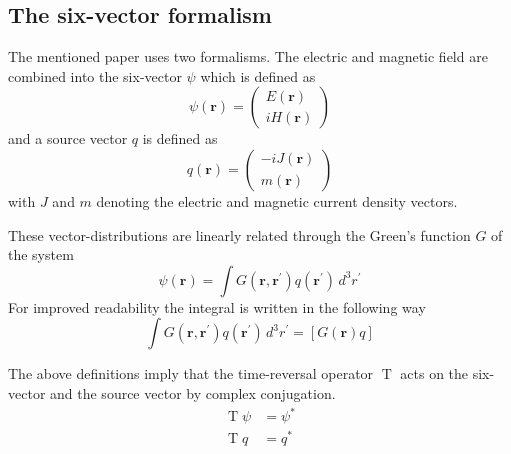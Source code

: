 \subsection{The six-vector formalism}
The mentioned paper uses two formalisms.
The electric and magnetic field are combined into the  six-vector \(\psi \) which is defined as
\begin{equation}
    \psi(\mathbf{r}) = \begin{pmatrix}
        E(\mathbf{r}) \\
        i H(\mathbf{r})
    \end{pmatrix}
\end{equation}
and a source vector \(q\) is defined as
\begin{equation}
    q(\mathbf{r}) = \begin{pmatrix}
        -i J(\mathbf{r}) \\
        m(\mathbf{r})
    \end{pmatrix}
\end{equation}
with \(J\) and \(m\) denoting the electric and magnetic current density vectors.

These vector-distributions are linearly related through the Green's function \(G\) of the system
\begin{equation}
    \psi(\mathbf{r}) = \int G(\mathbf{r}, \mathbf{r}^{\prime}) q(\mathbf{r}^{\prime}) \, d^3 r^{\prime}
\end{equation}
For improved readability the integral is written in the following way
\begin{equation}
    \int G(\mathbf{r}, \mathbf{r}^{\prime}) q(\mathbf{r}^{\prime}) \, d^3 r^{\prime} = [G(\mathbf{r}) q]
\end{equation}

The above definitions imply that the time-reversal operator \(\operatorname{T}\) acts on the six-vector and the source vector by complex conjugation.
\begin{align}
    \operatorname{T}\psi &= \psi^* \\
    \operatorname{T}q &= q^*
\end{align}

